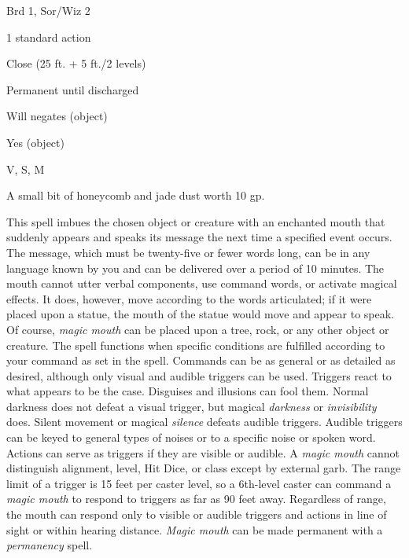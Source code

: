 
\begin{description*}
\item[Level:] Brd 1, Sor/Wiz 2
\item[Casting Time:] 1 standard action
\item[Range:] Close (25 ft. + 5 ft./2 levels)
\item[Duration:] Permanent until discharged
\item[Saving Throw:] Will negates (object)
\item[Spell Resistance:] Yes (object)
\item[Components:] V, S, M
\item[Arcane Material Component:] A small bit of honeycomb and jade dust worth 10 gp.
\end{description*}

This spell imbues the chosen object or creature with an enchanted mouth that suddenly
appears and speaks its message the next time a specified event occurs. The message,
which must be twenty-five or fewer words long, can be in any language known by
you and can be delivered over a period of 10 minutes. The mouth cannot utter verbal
components, use command words, or activate magical effects. It does, however, move
according to the words articulated; if it were placed upon a statue, the mouth
of the statue would move and appear to speak. Of course, \textit{magic mouth} can
be placed upon a tree, rock, or any other object or creature.
The spell functions when specific conditions are fulfilled according to your command
as set in the spell. Commands can be as general or as detailed as desired, although
only visual and audible triggers can be used. Triggers react to what appears to
be the case. Disguises and illusions can fool them. Normal darkness does not defeat
a visual trigger, but magical \textit{darkness} or \textit{invisibility} does.
Silent movement or magical \textit{silence} defeats audible triggers. Audible triggers
can be keyed to general types of noises or to a specific noise or spoken word.
Actions can serve as triggers if they are visible or audible. A \textit{magic mouth
}cannot distinguish alignment, level, Hit Dice, or class except by external garb.
The range limit of a trigger is 15 feet per caster level, so a 6th-level caster
can command a \textit{magic mouth} to respond to triggers as far as 90 feet away.
Regardless of range, the mouth can respond only to visible or audible triggers
and actions in line of sight or within hearing distance.
\textit{Magic mouth} can be made permanent with a \textit{permanency} spell.